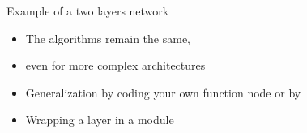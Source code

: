 \begin{frame}{Example of a two layers network}
  \begin{center}
    
  \end{center}
  \begin{itemize}
  \item The algorithms remain the same,
  \item even for more complex
    architectures
  \item Generalization by coding your own  function node or by
  \item Wrapping a layer in a module
  \end{itemize}
\end{frame}

